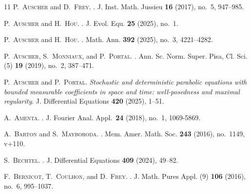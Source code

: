 \documentclass[11pt, leqno]{amsart}
\theoremstyle{definition}
\begin{document}
\begin{thebibliography}{11}
		\textsc{P.~Auscher} and \textsc{D.~Frey}.
		.
		\newblock J. Inst. Math. Jussieu \textbf{16} (2017), no.~5, 947--985.

		\textsc{P.~Auscher} and \textsc{H.~Hou}.
		.
		\newblock J. Evol. Equ. \textbf{25} (2025), no.~1.

		\textsc{P.~Auscher} and \textsc{H.~Hou}.
		.
		\newblock Math. Ann. \textbf{392} (2025), no.~3, 4221--4282.


		\textsc{P.~Auscher}, \textsc{S.~Monniaux}, and \textsc{P.~Portal}.
		.
		\newblock Ann. Sc. Norm. Super. Pisa, Cl. Sci. (5) \textbf{19} (2019), no.~2, 387--471.

		\textsc{P.~Auscher} and \textsc{P.~Portal}.
		{\em Stochastic and deterministic parabolic equations with bounded measurable coefficients in space and time: well-posedness and maximal regularity\/}.
		\newblock J. Differential Equations \textbf{420} (2025), 1--51.

		\textsc{A.~Amenta}.
		.
		\newblock J. Fourier Anal. Appl.~\textbf{24} (2018), no.~1, 1069-5869.

		\textsc{A.~Barton} and \textsc{S.~Mayboroda}.
		.
		\newblock Mem. Amer. Math. Soc. \textbf{243} (2016), no.~1149, v+110.

		\textsc{S.~Bechtel}.
		.
		\newblock J. Differential Equations \textbf{409} (2024), 49--82.

		\textsc{F.~Bernicot}, \textsc{T.~Coulhon}, and \textsc{D.~Frey}.
		.
		\newblock J. Math. Pures Appl. (9) \textbf{106} (2016), no.~6, 995--1037.




\end{thebibliography}
\end{document}
